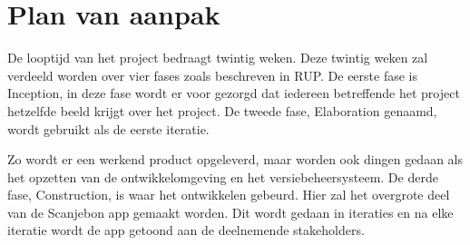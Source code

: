 \documentclass[a4paper,11pt,oneside]{report}
\begin{document}
\chapter{Plan van aanpak}
De looptijd van het project bedraagt twintig weken. Deze twintig weken zal verdeeld worden over vier fases zoals beschreven in RUP. De eerste fase is Inception, in deze fase wordt er voor gezorgd dat iedereen betreffende het project hetzelfde beeld krijgt over het project. De tweede fase, Elaboration genaamd, wordt gebruikt als de eerste iteratie.

Zo wordt er een werkend product opgeleverd, maar worden ook dingen gedaan als het opzetten van de ontwikkelomgeving en het versiebeheersysteem. De derde fase, Construction, is waar het ontwikkelen gebeurd. Hier zal het overgrote deel van de Scanjebon app gemaakt worden. Dit wordt gedaan in iteraties en na elke iteratie wordt de app getoond aan de deelnemende stakeholders.
\end{document}
